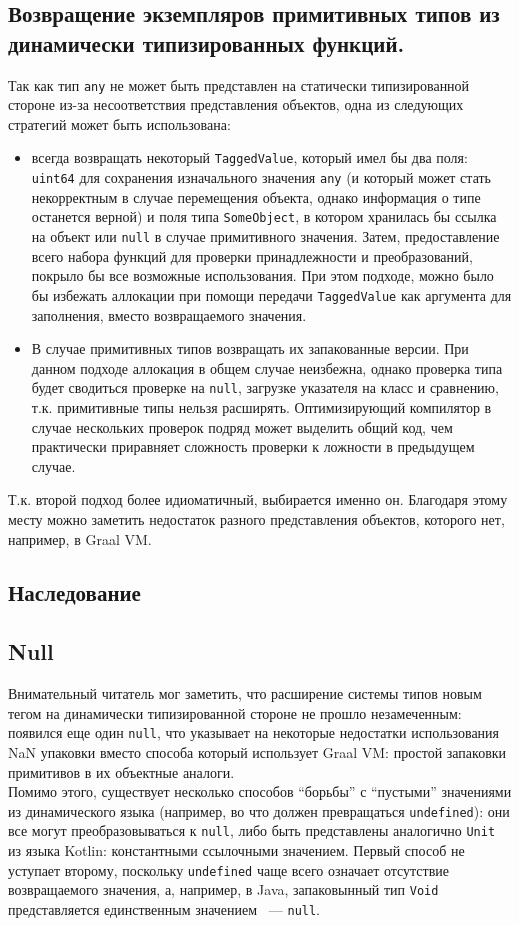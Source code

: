 \documentclass[times,specification,annotation]{itmo-student-thesis}
\begin{document}
\subsection{Возвращение экземпляров примитивных типов из динамически типизированных функций.}
Так как тип \texttt{any} не может быть представлен на статически типизированной стороне из-за несоответствия представления объектов, одна из следующих стратегий может быть использована:
\begin{itemize}
	\item всегда возвращать некоторый \texttt{TaggedValue}, который имел бы два поля: \texttt{uint64} для сохранения изначального значения \texttt{any} (и который может стать некорректным в случае перемещения объекта, однако информация о типе останется верной) и поля типа \texttt{SomeObject}, в котором хранилась бы ссылка на объект или \texttt{null} в случае примитивного значения. Затем, предоставление всего набора функций для проверки принадлежности и преобразований, покрыло бы все возможные использования. При этом подходе, можно было бы избежать аллокации при помощи передачи \texttt{TaggedValue} как аргумента для заполнения, вместо возвращаемого значения.
	\item В случае примитивных типов возвращать их запакованные версии. При данном подходе аллокация в общем случае неизбежна, однако проверка типа будет сводиться проверке на \texttt{null}, загрузке указателя на класс и сравнению, т.к. примитивные типы нельзя расширять. Оптимизирующий компилятор в случае нескольких проверок подряд может выделить общий код, чем практически приравняет сложность проверки к ложности в предыдущем случае.
\end{itemize}
Т.к. второй подход более идиоматичный, выбирается именно он. Благодаря этому месту можно заметить недостаток разного представления объектов, которого нет, например, в Graal VM.
\subsection{Наследование}
\TODO
\subsection{Null}
Внимательный читатель мог заметить, что расширение системы типов новым тегом на динамически типизированной стороне не прошло незамеченным: появился еще один \texttt{null}, что указывает на некоторые недостатки использования NaN упаковки вместо способа который использует Graal VM: простой запаковки примитивов в их объектные аналоги.\\
Помимо этого, существует несколько способов ``борьбы'' с ``пустыми'' значениями из динамического языка (например, во что должен превращаться \texttt{undefined}): они все могут преобразовываться к \texttt{null}, либо быть представлены аналогично \texttt{Unit} из языка Kotlin: константными ссылочными значением. Первый способ не уступает второму, поскольку \texttt{undefined} чаще всего означает отсутствие возвращаемого значения, а, например, в Java, запаковынный тип \texttt{Void} представляется единственным значением ~--- \texttt{null}.
\end{document}
